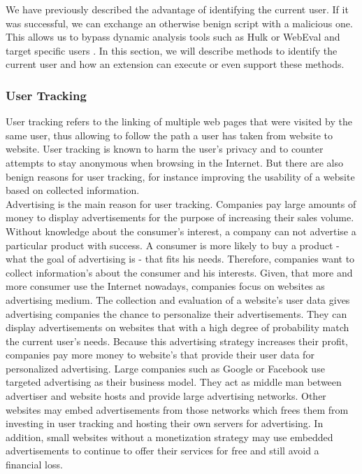 	We have previously described the advantage of identifying the current user. If it was successful, we can exchange an otherwise benign script with a malicious one. This allows us to bypass dynamic analysis tools such as Hulk or WebEval and target specific users \cite{184485, 190984}. In this section, we will describe methods to identify the current user and how an extension can execute or even support these methods. 



\subsubsection{User Tracking}

	User tracking refers to the linking of multiple web pages that were visited by the same user, thus allowing to follow the path a user has taken from website to website. User tracking is known to harm the user's privacy and to counter attempts to stay anonymous when browsing in the Internet. %
	But there are also benign reasons for user tracking, for instance improving the usability of a website based on collected information. \\ 
	
	Advertising is the main reason for user tracking. Companies pay large amounts of money to display advertisements for the purpose of increasing their sales volume. Without knowledge about the consumer's interest, a company can not advertise a particular product with success. A consumer is more likely to buy a product - what the goal of advertising is - that fits his needs. Therefore, companies want to collect information's about the consumer and his interests. Given, that more and more consumer use the Internet nowadays, companies focus on websites as advertising medium. The collection and evaluation of a website's user data gives advertising companies the chance to personalize their advertisements. They can display advertisements on websites that with a high degree of probability match the current user's needs. Because this advertising strategy increases their profit, companies pay more money to website's that provide their user data for personalized advertising. Large companies such as Google or Facebook use targeted advertising as their business model. They act as middle man between advertiser and website hosts and provide large advertising networks. Other websites may embed advertisements from those networks which frees them from investing in user tracking and hosting their own servers for advertising. In addition, small websites without a monetization strategy may use embedded advertisements to continue to offer their services for free and still avoid a financial loss. \\
	
